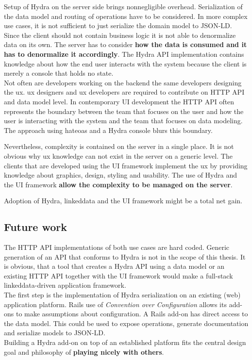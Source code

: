 Setup of Hydra on the server side brings nonnegligible overhead. Serialization of the data model and routing of operations have to be considered. In more complex use cases, it is not sufficient to just serialize the domain model to JSON-LD. Since the client should not contain business logic it is not able to denormalize data on its own. The server has to consider \textbf{how the data is consumed and it has to denormalize it accordingly}. The Hydra API implementation contains knowledge about how the end user interacts with the system because the client is merely a \gls{console} that holds no state. \\
Not often are developers working on the \gls{backend} the same developers designing the \gls{ux}. \gls{ux} designers and \gls{ux} developers are required to contribute on HTTP API and data model level. In contemporary UI development the HTTP API often represents the boundary between the team that focuses on the user and how the user is interacting with the system and the team that focuses on data modeling. The approach using \gls{hateoas} and a Hydra \gls{console} blurs this boundary.

Nevertheless, complexity is contained on the server in a single place. It is not obvious why \gls{ux} knowledge can not exist in the server on a generic level. The clients that are developed using the UI framework implement the \gls{ux} by providing knowledge about graphics, design, styling and usability. The use of Hydra and the UI framework \textbf{allow the complexity to be managed on the server}.

Adoption of Hydra, \gls{linkeddata} and the UI framework might be a total net gain.

\subsection{Future work}
The HTTP API implementations of both use cases are hard coded. Generic generation of an API that conforms to Hydra is not in the scope of this thesis. It is obvious, that a tool that creates a Hydra API using a data model or an existing HTTP API together with the UI framework would make a full-stack \gls{linkeddata}-driven application framework. \\
The first step is the implementation of Hydra serialization on an existing (web) application platform. Rails use of \textit{Convention over Configuration} allows its add-ons to make assumptions about configuration. A Rails add-on has direct access to the data model. This could be used to expose operations, generate documentation and serialize models to JSON-LD. \\
Building a Hydra add-on on top of an established platform fits the central design goal and philosophy of \textbf{playing nicely with others}.
